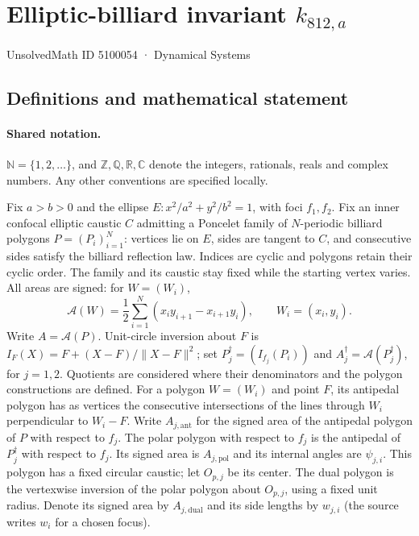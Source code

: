 \documentclass[11pt]{article}
\begin{document}
\setcounter{section}{5100053}
\section{Elliptic-billiard invariant $k_{812,a}$}\label{5100054}
{\small\sffamily UnsolvedMath ID 5100054 · Dynamical Systems}
\subsection{Definitions and mathematical statement}

\paragraph{Shared notation.}$\mathbb N=\{1,2,\ldots\}$, and $\mathbb Z,\mathbb Q,\mathbb R,\mathbb C$ denote the integers, rationals, reals and complex numbers. Any other conventions are specified locally.


Fix $a>b>0$ and the ellipse $E:x^2/a^2+y^2/b^2=1$, with foci $f_1,f_2$. Fix an inner confocal elliptic caustic $C$ admitting a Poncelet family of $N$-periodic billiard polygons $P=(P_i)_{i=1}^N$: vertices lie on $E$, sides are tangent to $C$, and consecutive sides satisfy the billiard reflection law. Indices are cyclic and polygons retain their cyclic order. The family and its caustic stay fixed while the starting vertex varies. All areas are signed: for $W=(W_i)$,
\[\mathcal A(W)=\frac12\sum_{i=1}^N(x_i y_{i+1}-x_{i+1}y_i),\qquad W_i=(x_i,y_i).\]
Write $A=\mathcal A(P)$. Unit-circle inversion about $F$ is $I_F(X)=F+(X-F)/\lVert X-F\rVert^2$; set $P_j^\dagger=(I_{f_j}(P_i))$ and $A_j^\dagger=\mathcal A(P_j^\dagger)$, for $j=1,2$. Quotients are considered where their denominators and the polygon constructions are defined. For a polygon $W=(W_i)$ and point $F$, its antipedal polygon has as vertices the consecutive intersections of the lines through $W_i$ perpendicular to $W_i-F$. Write $A_{j,\mathrm{ant}}$ for the signed area of the antipedal polygon of $P$ with respect to $f_j$. The polar polygon with respect to $f_j$ is the antipedal of $P_j^\dagger$ with respect to $f_j$. Its signed area is $A_{j,\mathrm{pol}}$ and its internal angles are $\psi_{j,i}$. This polygon has a fixed circular caustic; let $O_{p,j}$ be its center. The dual polygon is the vertexwise inversion of the polar polygon about $O_{p,j}$, using a fixed unit radius. Denote its signed area by $A_{j,\mathrm{dual}}$ and its side lengths by $w_{j,i}$ (the source writes $w_i$ for a chosen focus).
\end{document}
